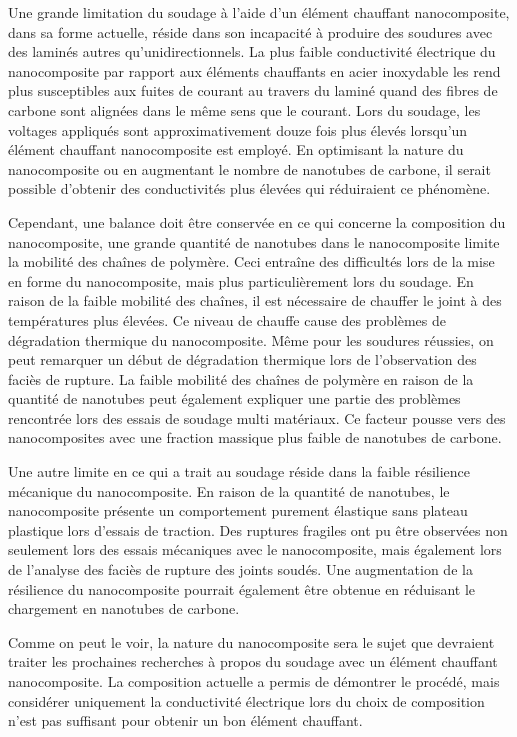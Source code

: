 Une grande limitation du soudage à l'aide d'un élément chauffant nanocomposite, dans sa forme actuelle, réside dans son incapacité à produire des soudures avec des laminés autres qu'unidirectionnels. 
La plus faible conductivité électrique du nanocomposite par rapport aux éléments chauffants en acier inoxydable les rend plus susceptibles aux fuites de courant au travers du laminé quand des fibres de carbone sont alignées dans le même sens que le courant. 
Lors du soudage, les voltages appliqués sont approximativement douze fois plus élevés lorsqu'un élément chauffant nanocomposite est employé. 
En optimisant la nature du nanocomposite ou en augmentant le nombre de nanotubes de carbone, il serait possible d'obtenir des conductivités plus élevées qui réduiraient ce phénomène. 

Cependant, une balance doit être conservée en ce qui concerne la composition du nanocomposite, une grande quantité de nanotubes dans le nanocomposite limite la mobilité des chaînes de polymère. 
Ceci entraîne des difficultés lors de la mise en forme du nanocomposite, mais plus particulièrement lors du soudage.
En raison de la faible mobilité des chaînes, il est nécessaire de chauffer le joint à des températures plus élevées. 
Ce niveau de chauffe cause des problèmes de dégradation thermique du nanocomposite. 
Même pour les soudures réussies, on peut remarquer un début de dégradation thermique lors de l'observation des faciès de rupture. 
La faible mobilité des chaînes de polymère en raison de la quantité de nanotubes peut également expliquer une partie des problèmes rencontrée lors des essais de soudage multi matériaux. 
Ce facteur pousse vers des nanocomposites avec une fraction massique plus faible de nanotubes de carbone. 

Une autre limite en ce qui a trait au soudage réside dans la faible résilience mécanique du nanocomposite. 
En raison de la quantité de nanotubes, le nanocomposite présente un comportement purement élastique sans plateau plastique lors d'essais de traction. 
Des ruptures fragiles ont pu être observées non seulement lors des essais mécaniques avec le nanocomposite, mais également lors de l'analyse des faciès de rupture des joints soudés. 
Une augmentation de la résilience du nanocomposite pourrait également être obtenue en réduisant le chargement en nanotubes de carbone. 

Comme on peut le voir, la nature du nanocomposite sera le sujet que devraient traiter les prochaines recherches à propos du soudage avec un élément chauffant nanocomposite. 
La composition actuelle a permis de démontrer le procédé, mais considérer uniquement la conductivité électrique lors du choix de composition n'est pas suffisant pour obtenir un bon élément chauffant.

